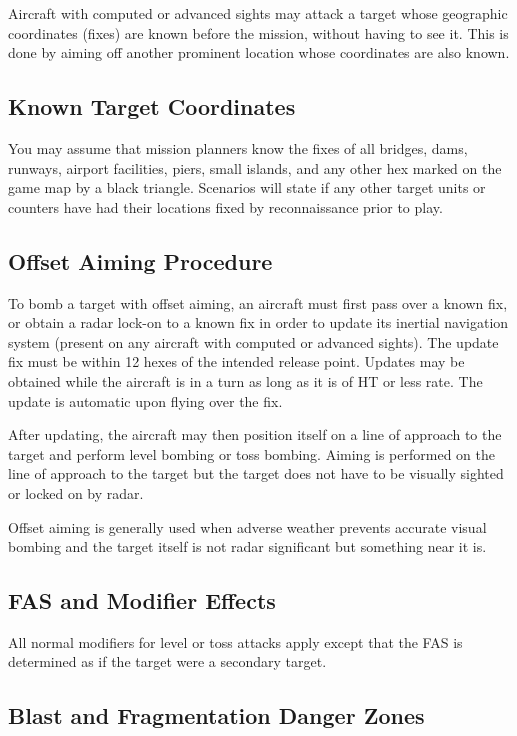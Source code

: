 \begin{advancedrules}
    Aircraft with computed or advanced sights may attack a target whose geographic coordinates (fixes) are known before the mission, without having to see it. This is done by aiming off another prominent location whose coordinates are also known.

    \subsection{Known Target Coordinates} You may assume that mission planners know the fixes of all bridges, dams, runways, airport facilities, piers, small islands, and any other hex marked on the game map by a black triangle. Scenarios will state if any other target units or counters have had their locations fixed by reconnaissance prior to play.

    \subsection{Offset Aiming Procedure} To bomb a target with offset aiming, an aircraft must first pass over a known fix, or obtain a radar lock-on to a known fix in order to update its inertial navigation system (present on any aircraft with computed or advanced sights). The update fix must be within 12 hexes of the intended release point. Updates may be obtained while the aircraft is in a turn as long as it is of HT or less rate. The update is automatic upon flying over the fix.

    After updating, the aircraft may then position itself on a line of approach to the target and perform level bombing or toss bombing. Aiming is performed on the line of approach to the target but the target does not have to be visually sighted or locked on by radar.

    Offset aiming is generally used when adverse weather prevents accurate visual bombing and the target itself is not radar significant but something near it is.

    \subsection{FAS and Modifier Effects} All normal modifiers for level or toss attacks apply except that the FAS is determined as if the target were a secondary target.

    \subsection{Blast and Fragmentation Danger Zones}


\end{advancedrules}

